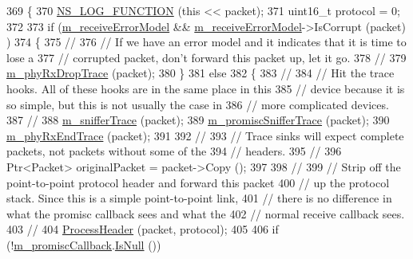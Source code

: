 \begin{DoxyCode}
369 \{
370   \hyperlink{log-macros-disabled_8h_a90b90d5bad1f39cb1b64923ea94c0761}{NS\_LOG\_FUNCTION} (\textcolor{keyword}{this} << packet);
371   uint16\_t protocol = 0;
372 
373   \textcolor{keywordflow}{if} (\hyperlink{classns3_1_1PointToPointNetDevice_a685e60184c60bf96abc011081e1d589b}{m\_receiveErrorModel} && \hyperlink{classns3_1_1PointToPointNetDevice_a685e60184c60bf96abc011081e1d589b}{m\_receiveErrorModel}->IsCorrupt (packet) 
      ) 
374     \{
375       \textcolor{comment}{// }
376       \textcolor{comment}{// If we have an error model and it indicates that it is time to lose a}
377       \textcolor{comment}{// corrupted packet, don't forward this packet up, let it go.}
378       \textcolor{comment}{//}
379       \hyperlink{classns3_1_1PointToPointNetDevice_a8c980fe1c80f3e7c084e489e0176aeda}{m\_phyRxDropTrace} (packet);
380     \}
381   \textcolor{keywordflow}{else} 
382     \{
383       \textcolor{comment}{// }
384       \textcolor{comment}{// Hit the trace hooks.  All of these hooks are in the same place in this }
385       \textcolor{comment}{// device because it is so simple, but this is not usually the case in}
386       \textcolor{comment}{// more complicated devices.}
387       \textcolor{comment}{//}
388       \hyperlink{classns3_1_1PointToPointNetDevice_ae62def3355a42b37b41f7d59dc81bb0e}{m\_snifferTrace} (packet);
389       \hyperlink{classns3_1_1PointToPointNetDevice_ad1f77c2c8a3e70210dfd89f0d4b670de}{m\_promiscSnifferTrace} (packet);
390       \hyperlink{classns3_1_1PointToPointNetDevice_a087003567f5836b7dafda69423dda203}{m\_phyRxEndTrace} (packet);
391 
392       \textcolor{comment}{//}
393       \textcolor{comment}{// Trace sinks will expect complete packets, not packets without some of the}
394       \textcolor{comment}{// headers.}
395       \textcolor{comment}{//}
396       Ptr<Packet> originalPacket = packet->Copy ();
397 
398       \textcolor{comment}{//}
399       \textcolor{comment}{// Strip off the point-to-point protocol header and forward this packet}
400       \textcolor{comment}{// up the protocol stack.  Since this is a simple point-to-point link,}
401       \textcolor{comment}{// there is no difference in what the promisc callback sees and what the}
402       \textcolor{comment}{// normal receive callback sees.}
403       \textcolor{comment}{//}
404       \hyperlink{classns3_1_1PointToPointNetDevice_ac2e48ae3ee00fcaff6f9e98984e5d3c6}{ProcessHeader} (packet, protocol);
405 
406       \textcolor{keywordflow}{if} (!\hyperlink{classns3_1_1PointToPointNetDevice_aea1f86277e393aa99e45f7c1f18c6799}{m\_promiscCallback}.\hyperlink{classns3_1_1Callback_aa8e27826badbf37f84763f36f70d9b54}{IsNull} ())

\end{DoxyCode}
